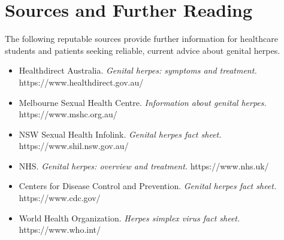 \section*{Sources and Further Reading}
The following reputable sources provide further information for healthcare students and patients seeking reliable, current advice about genital herpes.

\begin{itemize}
    \item Healthdirect Australia. \textit{Genital herpes: symptoms and treatment.} https://www.healthdirect.gov.au/
    \item Melbourne Sexual Health Centre. \textit{Information about genital herpes.} https://www.mshc.org.au/
    \item NSW Sexual Health Infolink. \textit{Genital herpes fact sheet.} https://www.shil.nsw.gov.au/
    \item NHS. \textit{Genital herpes: overview and treatment.} https://www.nhs.uk/
    \item Centers for Disease Control and Prevention. \textit{Genital herpes fact sheet.} https://www.cdc.gov/
    \item World Health Organization. \textit{Herpes simplex virus fact sheet.} https://www.who.int/
\end{itemize}
